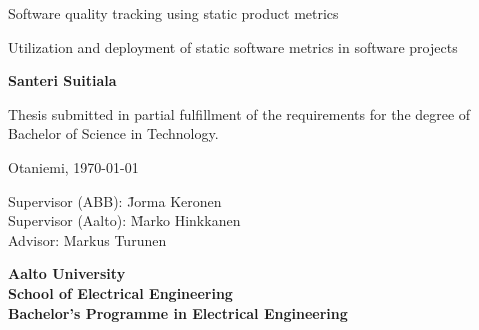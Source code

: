 {\parindent0pt %
\begin{spacing}{1.1}

 {\sffamily{}}
\end{spacing}

\vspace{12.7mm}

\begin{spacing}{1.63}
{\fontsize{17.8pt}{17.8pt}\selectfont Software quality tracking using static product metrics}
\end{spacing}

\vspace{10.5mm}

\begin{spacing}{1.2}
{\fontsize{13pt}{13pt}\selectfont Utilization and deployment of static software metrics in software projects}
\end{spacing}

\vspace{10.6mm}

{\fontsize{13.9pt}{13.9pt}\bfseries\sffamily\lsstyle Santeri Suitiala}

\vfill

{\fontsize{10.3pt}{10.3pt}\sffamily\lsstyle\raggedright
\begin{spacing}{1.06}

Thesis submitted in partial fulfillment of the requirements for the
degree of Bachelor of Science in Technology.

Otaniemi, \today

\begin{tabbing}
Supervisor (ABB):\hspace{6mm} \= Jorma Keronen \\
Supervisor (Aalto):\hspace{6mm} \= Marko Hinkkanen \\
Advisor: \> Markus Turunen
\end{tabbing}
\vspace{-4mm}
\end{spacing}
} %

\vspace{11.5mm}

\begin{spacing}{.9}
{\bfseries\sffamily\lsstyle Aalto University \\
School of Electrical Engineering \\
Bachelor’s Programme in Electrical Engineering}
\end{spacing}
} %



